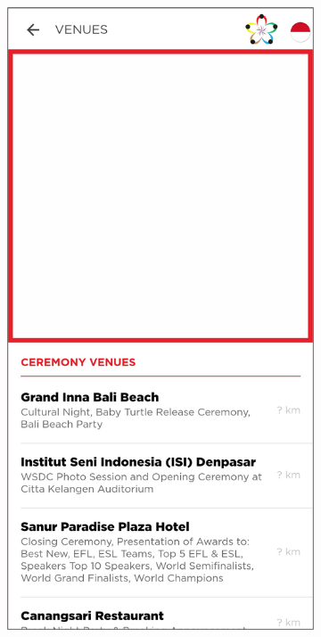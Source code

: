 \begin{itemize}
\begin{figure}[H]
     \centering
     \begin{subfigure}[b]{0.3\textwidth}
         \centering
         \includegraphics[width=\textwidth]{Gambar/VenuesMapPageKontainer.png}

\end{subfigure}
\end{figure}
\end{itemize}
